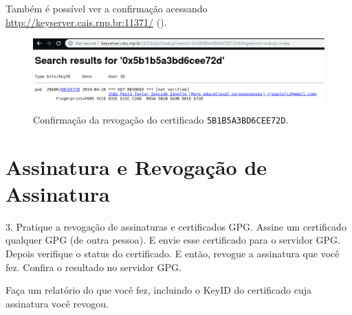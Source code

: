 \documentclass{article}
\begin{document}
    Também é possível ver a confirmação acessando
    \url{http://keyserver.cais.rnp.br:11371/} ().

    \begin{figure}[ht]
        \centering
        \includegraphics[keepaspectratio,width=1\textwidth]{revoked-keyserver.png}
        \caption{%
            Confirmação da revogação do certificado
            \texttt{5B1B5A3BD6CEE72D}.\label{fig:revokee}
        }
    \end{figure}

    \section{Assinatura e Revogação de Assinatura}

    \begin{superframe}
        3. Pratique a revogação de assinaturas e certificados GPG\@. Assine um
        certificado qualquer GPG (de outra pessoa). E envie esse certificado
        para o servidor GPG\@. Depois verifique o status do certificado. E
        então, revogue a assinatura que você fez. Confira o resultado no
        servidor GPG\@.

        \begin{todolist}
            \item Faça um relatório do que você fez, incluindo o KeyID do
                certificado cuja assinatura você revogou.
        \end{todolist}
    \end{superframe}
\end{document}
